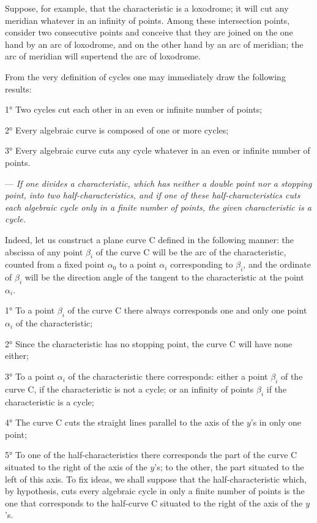 \documentclass[11pt]{article}
\begin{document}
Suppose, for example, that the characteristic is a loxodrome; it will cut any meridian whatever in an infinity of points. Among these intersection points, consider two consecutive points and conceive that they are joined on the one hand by an arc of loxodrome, and on the other hand by an arc of meridian; the arc of meridian will supertend the arc of loxodrome.

From the very definition of cycles one may immediately draw the following results:

1° Two cycles cut each other in an even or infinite number of points;

2° Every algebraic curve is composed of one or more cycles;

3° Every algebraic curve cuts any cycle whatever in an even or infinite number of points.

 --- \emph{If one divides a characteristic, which has neither a double point nor a stopping point, into two half-characteristics, and if one of these half-characteristics cuts each algebraic cycle only in a finite number of points, the given characteristic is a cycle.}

Indeed, let us construct a plane curve C defined in the following manner: the abscissa of any point $\beta_i$ of the curve C will be the arc of the characteristic, counted from a fixed point $\alpha_0$ to a point $\alpha_i$ corresponding to $\beta_i$, and the ordinate of $\beta_i$ will be the direction angle of the tangent to the characteristic at the point $\alpha_i$.

1° To a point $\beta_i$ of the curve C there always corresponds one and only one point $\alpha_i$ of the characteristic;

2° Since the characteristic has no stopping point, the curve C will have none either;

3° To a point $\alpha_i$ of the characteristic there corresponds: either a point $\beta_i$ of the curve C, if the characteristic is not a cycle; or an infinity of points $\beta_i$ if the characteristic is a cycle;

4° The curve C cuts the straight lines parallel to the axis of the $y$’s in only one point;

5° To one of the half-characteristics there corresponds the part of the curve C situated to the right of the axis of the $y$’s; to the other, the part situated to the left of this axis. To fix ideas, we shall suppose that the half-characteristic which, by hypothesis, cuts every algebraic cycle in only a finite number of points is the one that corresponds to the half-curve C situated to the right of the axis of the $y$’s.
\end{document}
